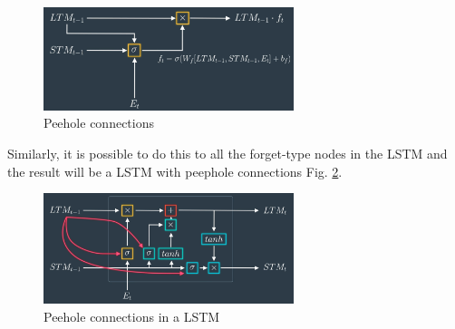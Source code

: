 \documentclass{article}
\begin{document}
\begin{figure}[ht]
    \centering
    \includegraphics[width=0.65\textwidth,height=0.65\textheight,keepaspectratio]{images/peehole.png}
    \captionsetup{justification=centering}
    \caption{Peehole connections}
    \label{fig:f15}
\end{figure}

Similarly, it is possible to do this to all the forget-type nodes in the LSTM and the result will be a LSTM with peephole connections Fig. \ref{fig:f16}.

\begin{figure}[ht]
    \centering
    \includegraphics[width=0.65\textwidth,height=0.65\textheight,keepaspectratio]{images/peehole_lstm.png}
    \captionsetup{justification=centering}
    \caption{Peehole connections in a LSTM}
    \label{fig:f16}
\end{figure}

\printbibliography
\end{document}
